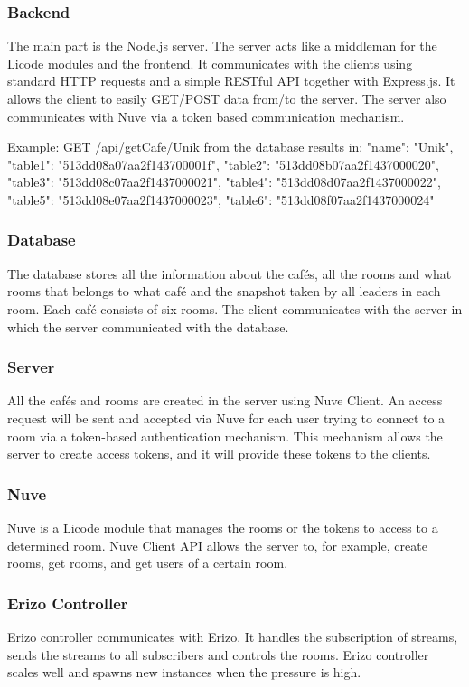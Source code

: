 \documentclass[12pt, titlepage]{article}
\begin{document}
\subsubsection{Backend}
The main part is the Node.js server. The server acts like a middleman for the Licode modules and the frontend. It communicates with the clients using standard HTTP requests and a simple RESTful API together with Express.js. It allows the client to easily GET/POST data from/to the server. The server also communicates with Nuve via a token based communication mechanism.

Example: GET /api/getCafe/Unik from the database results in:
"name": "Unik",
"table1": "513dd08a07aa2f143700001f",
"table2": "513dd08b07aa2f1437000020",
"table3": "513dd08c07aa2f1437000021",
"table4": "513dd08d07aa2f1437000022",
"table5": "513dd08e07aa2f1437000023",
"table6": "513dd08f07aa2f1437000024"
\subsubsection{Database}
The database stores all the information about the cafés, all the rooms and what rooms that belongs to what café and the snapshot taken by all leaders in each room. Each café consists of six rooms. The client communicates with the server in which the server communicated with the database.
\subsubsection{Server}
All the cafés and rooms are created in the server using Nuve Client. An access request will be sent and accepted via Nuve for each user trying to connect to a room via a token-based authentication mechanism. This mechanism allows the server to create access tokens, and it will provide these tokens to the clients. 
\subsubsection{Nuve}
Nuve is a Licode module that manages the rooms or the tokens to access to a determined room. Nuve Client API allows the server to, for example, create rooms, get rooms, and get users of a certain room.
\subsubsection{Erizo Controller}
Erizo controller communicates with Erizo. It handles the subscription of streams, sends the streams to all subscribers and controls the rooms. Erizo controller scales well and spawns new instances when the pressure is high.
\end{document}
